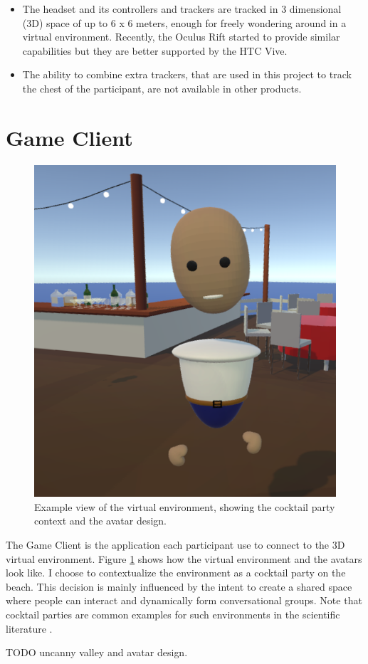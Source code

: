 \documentclass[]{simple-thesis}
\begin{document}
\begin{itemize}
  \item The headset and its controllers and trackers are tracked in 3 dimensional (3D) space of up to 6 x 6 meters, enough for freely wondering around in a virtual environment. Recently, the Oculus Rift started to provide similar capabilities but they are better supported by the HTC Vive.
  \item The ability to combine extra trackers, that are used in this project to track the chest of the participant, are not available in other products.
\end{itemize}

\section{Game Client}

\begin{figure}
  \centering
  \includegraphics[width=.5\textwidth]{../graphics/environment_demo.png}
  \caption{Example view of the virtual environment, showing the cocktail party context and the avatar design.}
  \label{fig:system:environment_demo}
\end{figure}

The Game Client is the application each participant use to connect to the 3D virtual environment.
Figure \ref{fig:system:environment_demo} shows how the virtual environment and the avatars look like.
I choose to contextualize the environment as a cocktail party on the beach.
This decision is mainly influenced by the intent to create a shared space where people can interact and dynamically form conversational groups.
Note that cocktail parties are common examples for such environments in the scientific literature \citep{Setti2015}.

TODO uncanny valley and avatar design.
\end{document}
